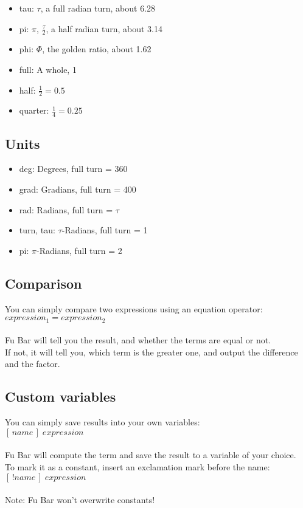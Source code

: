 \documentclass[12pt,a4paper]{article}
\begin{document}
	\begin{itemize}
		\item tau: $\tau$, a full radian turn, about 6.28
		\item pi: $\pi$, $\frac{\tau}{2}$, a half radian turn, about 3.14
		\item phi: $\Phi$, the golden ratio, about 1.62
		\item full: A whole, 1
		\item half: $\frac{1}{2} = 0.5$
		\item quarter: $\frac{1}{4} = 0.25$
	\end{itemize}
	
	\subsection{Units}
	
	\begin{itemize}
		\item deg: Degrees, full turn = 360
		\item grad: Gradians, full turn = 400
		\item rad: Radians, full turn = $\tau$
		\item turn, tau: $\tau$-Radians, full turn = 1
		\item pi: $\pi$-Radians, full turn = 2
	\end{itemize}
	
	\subsection{Comparison}
	
	You can simply compare two expressions using an equation operator:\\
	$expression_1 = expression_2$\\
	\\
	Fu Bar will tell you the result, and whether the terms are equal or not.\\
	If not, it will tell you, which term is the greater one, and output the difference and the factor.
	
	\subsection{Custom variables}
	
	You can simply save results into your own variables:\\
	$[\,name\,]\;expression$\\
	\\
	Fu Bar will compute the term and save the result to a variable of your choice.\\
	To mark it as a constant, insert an exclamation mark before the name:\\
	$[\,!name\,]\;expression$\\\\
	Note: Fu Bar won't overwrite constants!
	
\end{document}
